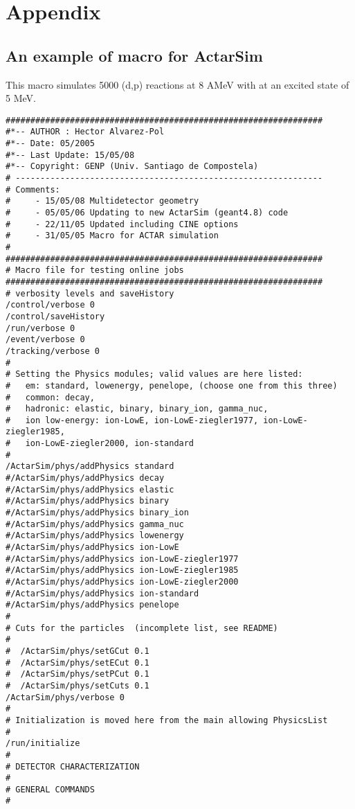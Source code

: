\section{Appendix}

\subsection{An example of macro for ActarSim}\label{sec-ActarSim-macro}
This macro simulates 5000 (d,p) reactions at 8 AMeV with  at an excited state of 5 MeV.

\begin{verbatim}
################################################################
#*-- AUTHOR : Hector Alvarez-Pol
#*-- Date: 05/2005
#*-- Last Update: 15/05/08
#*-- Copyright: GENP (Univ. Santiago de Compostela)
# --------------------------------------------------------------
# Comments:
#     - 15/05/08 Multidetector geometry
#     - 05/05/06 Updating to new ActarSim (geant4.8) code
#     - 22/11/05 Updated including CINE options
#     - 31/05/05 Macro for ACTAR simulation
#
################################################################
# Macro file for testing online jobs
################################################################
# verbosity levels and saveHistory
/control/verbose 0
/control/saveHistory
/run/verbose 0
/event/verbose 0
/tracking/verbose 0
#
# Setting the Physics modules; valid values are here listed:
#   em: standard, lowenergy, penelope, (choose one from this three)
#   common: decay,
#   hadronic: elastic, binary, binary_ion, gamma_nuc,
#   ion low-energy: ion-LowE, ion-LowE-ziegler1977, ion-LowE-ziegler1985,
#   ion-LowE-ziegler2000, ion-standard
#
/ActarSim/phys/addPhysics standard
#/ActarSim/phys/addPhysics decay
#/ActarSim/phys/addPhysics elastic
#/ActarSim/phys/addPhysics binary
#/ActarSim/phys/addPhysics binary_ion
#/ActarSim/phys/addPhysics gamma_nuc
#/ActarSim/phys/addPhysics lowenergy
#/ActarSim/phys/addPhysics ion-LowE
#/ActarSim/phys/addPhysics ion-LowE-ziegler1977
#/ActarSim/phys/addPhysics ion-LowE-ziegler1985
#/ActarSim/phys/addPhysics ion-LowE-ziegler2000
#/ActarSim/phys/addPhysics ion-standard
#/ActarSim/phys/addPhysics penelope
#
# Cuts for the particles  (incomplete list, see README)
#
#  /ActarSim/phys/setGCut 0.1
#  /ActarSim/phys/setECut 0.1
#  /ActarSim/phys/setPCut 0.1
#  /ActarSim/phys/setCuts 0.1
/ActarSim/phys/verbose 0
#
# Initialization is moved here from the main allowing PhysicsList
#
/run/initialize
#
# DETECTOR CHARACTERIZATION
#
# GENERAL COMMANDS
#

\end{verbatim}
